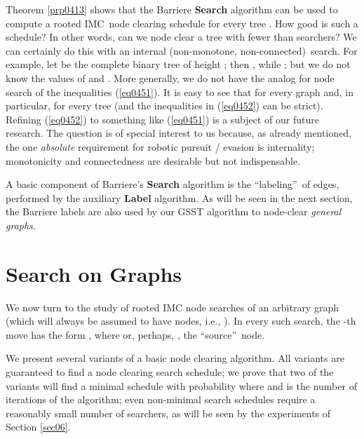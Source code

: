 \documentclass[11pt]{article}\usepackage{amsmath}
\begin{document}
\begin{remark}
\label{prp0416}Theorem \ref{prp0413} shows that the Barriere \textbf{Search}
algorithm can be used to compute a rooted IMC\ node clearing schedule for
every tree . How good is such a schedule? In other words, can we
node clear a tree  with fewer than  searchers? We can certainly do this with an internal
(non-monotone, non-connected)\ search. For example, let  be the complete binary tree of height ; then , while ; but we do not
know the values of  and . More
generally, we do not have the analog for node search of the inequalities
(\ref{eq0451}). It is easy to see that
for every graph  and, in particular, for every tree 
(and the inequalities in (\ref{eq0452}) can be strict). Refining
(\ref{eq0452}) to something like (\ref{eq0451}) is a subject of our future
research. The question is of special interest to us because, as already
mentioned, the one \emph{absolute} requirement for robotic pursuit / evasion
is internality; monotonicity and connectedness are desirable but not indispensable.
\end{remark}

\begin{remark}
\label{prp0417}A basic component of Barriere's \textbf{Search} algorithm is
the \textquotedblleft labeling\textquotedblright\ of edges, performed
by the auxiliary \textbf{Label} algorithm\cite{Barriere1}. As will be seen in
the next section, the Barriere  labels are also used by our GSST
algorithm to node-clear \emph{general graphs}.
\end{remark}

\section{Search on Graphs}

\label{sec05}

We now turn to the study of rooted IMC node searches of an arbitrary graph
 (which will always be assumed to have 
nodes, i.e., ). In every such search, the -th
move has the form , where  or, perhaps, , the \textquotedblleft source\textquotedblright\ node.

We present several variants of a basic node clearing algorithm. All variants
are guaranteed to find a node clearing search schedule; we prove that two of
the variants will find a minimal schedule with probability 
where  and  is the number of iterations of
the algorithm; even non-minimal search schedules require a reasonably small
number of searchers, as will be seen by the experiments of Section \ref{sec06}.
\end{document}
